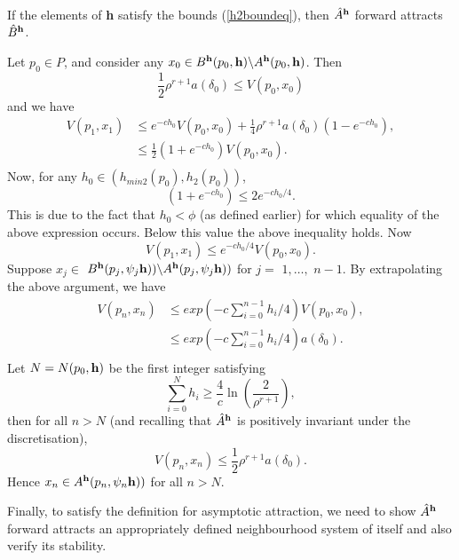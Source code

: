 \begin{lemma} \hfill \\
If the elements of {\bf h} satisfy the bounds (\ref{h2boundeq}),
then $\hat{A}^{{\bf h}}$ forward attracts $\hat{B}^{{\bf h}}$.
\end{lemma}
\begin{prf}
Let $p_0 \in P$, and consider any $x_0 \in B^{{\bf h}}(p_0, {\bf h})\backslash
A^{{\bf h}}(p_0,{\bf h})$. Then
\[ \frac{1}{2}\rho^{r+1} a(\delta_0) \leq V(p_0, x_0) \]
 and we have
\begin{align*}
  V(p_1, x_1) &\leq e^{-ch_0} V(p_0, x_0)+\frac{1}{4} \rho^{r+1} a(\delta_0)
            (1 - e^{-ch_0}), \\
  &\leq \frac{1}{2}(1 + e^{-ch_0}) V(p_0, x_0). \\
\end{align*}
Now, for any $h_0 \in (h_{min2}(p_0), h_2(p_0))$,
\[ (1 + e^{-ch_0}) \leq 2e^{-ch_0/4}. \]
This is due to the fact that $h_0
< \phi$ (as defined earlier) for which equality of the above expression occurs.
Below this value the above inequality holds. Now
\[ V(p_1, x_1) \leq e^{-ch_0/4} V(p_0, x_0). \]
Suppose $x_j \in$ $B^{{\bf h}}(p_j,\psi_j{\bf h}))\backslash
A^{{\bf h}}(p_j, \psi_j{\bf h}))$ for $j =$ $1, \dots,$ $n-1$. By
extrapolating the above argument, we have
\begin{align*}
  V(p_n, x_n) &\leq exp\left(-c\sum_{i=0}^{n-1}h_i/4\right) V(p_0, x_0), \\
  &\leq exp\left(-c\sum_{i=0}^{n-1}h_i/4\right) a(\delta_0). \\
\end{align*}
Let $N = N({p_0, \bf h})$ be the first integer satisfying
\[ \sum_{i=0}^{N}h_i \geq \frac{4}{c} \ln \left(
\frac{2}{\rho^{r+1}}\right), \]
then for all $n > N$ (and recalling that $\hat{A}^{{\bf h}}$ is positively
invariant under the discretisation),
\[ V(p_n, x_n) \leq \frac{1}{2} \rho^{r+1} a(\delta_0). \]
Hence $x_n \in A^{{\bf h}}(p_n, \psi_n{\bf h}))$ for all $n > N$.
\end{prf}

Finally, to satisfy the definition for asymptotic attraction, we need to show
$\hat{A}^{{\bf h}}$ forward attracts an appropriately defined neighbourhood
system of itself and also verify its stability.

